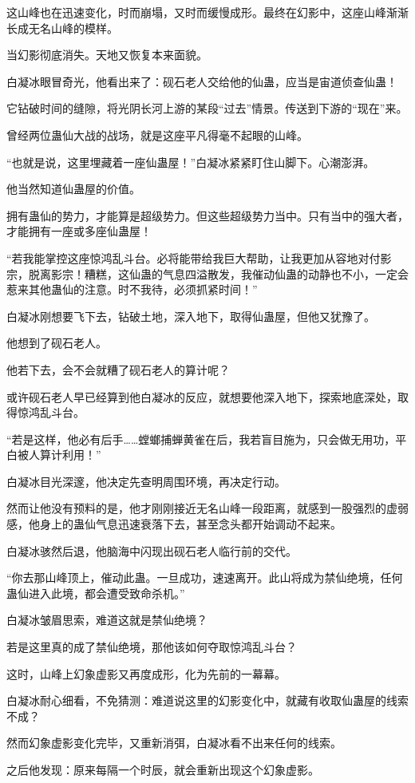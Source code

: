 \begin{this_body}
这山峰也在迅速变化，时而崩塌，又时而缓慢成形。最终在幻影中，这座山峰渐渐长成无名山峰的模样。

当幻影彻底消失。天地又恢复本来面貌。

白凝冰眼冒奇光，他看出来了：砚石老人交给他的仙蛊，应当是宙道侦查仙蛊！

它钻破时间的缝隙，将光阴长河上游的某段“过去”情景。传送到下游的“现在”来。

曾经两位蛊仙大战的战场，就是这座平凡得毫不起眼的山峰。

“也就是说，这里埋藏着一座仙蛊屋！”白凝冰紧紧盯住山脚下。心潮澎湃。

他当然知道仙蛊屋的价值。

拥有蛊仙的势力，才能算是超级势力。但这些超级势力当中。只有当中的强大者，才能拥有一座或多座仙蛊屋！

“若我能掌控这座惊鸿乱斗台。必将能带给我巨大帮助，让我更加从容地对付影宗，脱离影宗！糟糕，这仙蛊的气息四溢散发，我催动仙蛊的动静也不小，一定会惹来其他蛊仙的注意。时不我待，必须抓紧时间！”

白凝冰刚想要飞下去，钻破土地，深入地下，取得仙蛊屋，但他又犹豫了。

他想到了砚石老人。

他若下去，会不会就糟了砚石老人的算计呢？

或许砚石老人早已经算到他白凝冰的反应，就想要他深入地下，探索地底深处，取得惊鸿乱斗台。

“若是这样，他必有后手……螳螂捕蝉黄雀在后，我若盲目施为，只会做无用功，平白被人算计利用！”

白凝冰目光深邃，他决定先查明周围环境，再决定行动。

然而让他没有预料的是，他才刚刚接近无名山峰一段距离，就感到一股强烈的虚弱感，他身上的蛊仙气息迅速衰落下去，甚至念头都开始调动不起来。

白凝冰骇然后退，他脑海中闪现出砚石老人临行前的交代。

“你去那山峰顶上，催动此蛊。一旦成功，速速离开。此山将成为禁仙绝境，任何蛊仙进入此境，都会遭受致命杀机。”

白凝冰皱眉思索，难道这就是禁仙绝境？

若是这里真的成了禁仙绝境，那他该如何夺取惊鸿乱斗台？

这时，山峰上幻象虚影又再度成形，化为先前的一幕幕。

白凝冰耐心细看，不免猜测：难道说这里的幻影变化中，就藏有收取仙蛊屋的线索不成？

然而幻象虚影变化完毕，又重新消弭，白凝冰看不出来任何的线索。

之后他发现：原来每隔一个时辰，就会重新出现这个幻象虚影。


\end{this_body}

